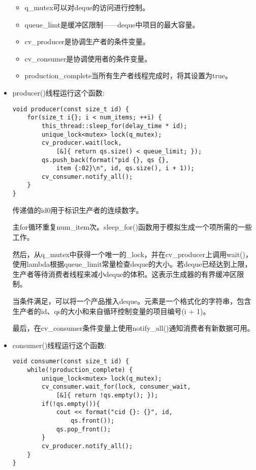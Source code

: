 \begin{itemize}
\begin{itemize}
\item 
q\_mutex可以对deque的访问进行控制。

\item 
queue\_limt是缓冲区限制——deque中项目的最大容量。

\item 
cv\_producer是协调生产者的条件变量。

\item 
cv\_consumer是协调使用者的条件变量。

\item 
production\_complete当所有生产者线程完成时，将其设置为true。
\end{itemize}

\item 
producer()线程运行这个函数:

\begin{lstlisting}[style=styleCXX]
void producer(const size_t id) {
	for(size_t i{}; i < num_items; ++i) {
		this_thread::sleep_for(delay_time * id);
		unique_lock<mutex> lock(q_mutex);
		cv_producer.wait(lock,
			[&]{ return qs.size() < queue_limit; });
		qs.push_back(format("pid {}, qs {},
			item {:02}\n", id, qs.size(), i + 1));
		cv_consumer.notify_all();
	}
}
\end{lstlisting}

传递值的id0用于标识生产者的连续数字。

主for循环重复num\_item次。sleep\_for()函数用于模拟生成一个项所需的一些工作。

然后，从q\_mutex中获得一个唯一的\_lock，并在cv\_producer上调用wait()，使用lambda根据queue\_limit常量检查deque的大小。若deque已经达到上限，生产者等待消费者线程来减小deque的体积。这表示生成器的有界缓冲区限制。

当条件满足，可以将一个产品推入deque。元素是一个格式化的字符串，包含生产者的id、qs的大小和来自循环控制变量的项目编号(i + 1)。

最后，在cv\_consumer条件变量上使用notify\_all()通知消费者有新数据可用。

\item 
consumer()线程运行这个函数:

\begin{lstlisting}[style=styleCXX]
void consumer(const size_t id) {
	while(!production_complete) {
		unique_lock<mutex> lock(q_mutex);
		cv_consumer.wait_for(lock, consumer_wait,
			[&]{ return !qs.empty(); });
		if(!qs.empty()){
			cout << format("cid {}: {}", id,
				qs.front());
			qs.pop_front();
		}
		cv_producer.notify_all();
	}
}
\end{lstlisting}


\end{itemize}
